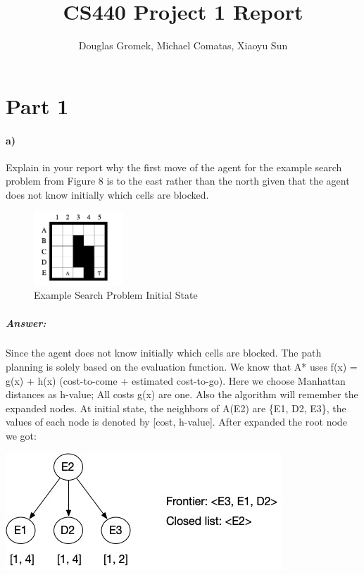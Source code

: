 \documentclass[11pt]{report}
\title{CS440 Project 1 Report}
\author{Douglas Gromek, Michael Comatas, Xiaoyu Sun}
\begin{document}
\maketitle
\section*{Part 1}
\paragraph{a)}
Explain in your report why the first move of the agent for the example search problem from Figure 8 is to the east rather than the north given that the agent does not know initially which cells are blocked.\\

\begin{figure}[h]
\begin{center}
\includegraphics[width=0.3\textwidth]{Part1a_Sample}
\caption{Example Search Problem Initial State}
\end{center}
\end{figure}
\subparagraph{Answer:}
Since the agent does not know initially which cells are blocked. The path planning is solely based on the evaluation function. We know that A* uses f(x) = g(x) + h(x) (cost-to-come + estimated cost-to-go). Here we choose Manhattan distances as h-value; All costs g(x) are one. Also the algorithm will remember the expanded nodes.
At initial state, the neighbors of A(E2) are \{E1, D2, E3\}, the values of each node is denoted by [cost, h-value]. After expanded the root node we got:\\
\begin{center}
\includegraphics[scale = 0.5]{Part1a_1}
\end{center}
\end{document}
